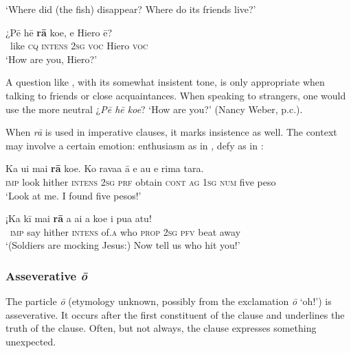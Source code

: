 \glt 
‘Where did (the fish) disappear? Where do its friends live?’ \textstyleExampleref{[R301.179,182]}
\z

\ea\label{ex:4.181}
\gll ¿Pē hē \textbf{rā} koe, e Hiero ē? \\
~like \textsc{cq} \textsc{intens} \textsc{2sg} \textsc{voc} Hiero \textsc{voc} \\

\glt
‘How are you, Hiero?’ \textstyleExampleref{[R315.081]} 
\z

A question like , with its somewhat insistent tone, is only appropriate when talking to friends or close acquaintances. When speaking to strangers, one would use the more neutral ¿\textit{Pē hē koe}? ‘How are you?’ (Nancy Weber, p.c.).

When \textit{rā} is used in imperative clauses, it marks insistence as well. The context may involve a certain emotion: enthusiasm as in , defy as in :

\ea\label{ex:4.182}
\gll Ka u{\ꞌ}i mai \textbf{rā} koe. Ko rava{\ꞌ}a {\ꞌ}ā e au e rima tara. \\
\textsc{imp} look hither \textsc{intens} \textsc{2sg} \textsc{prf} obtain \textsc{cont} \textsc{ag} \textsc{1sg} \textsc{num} five peso \\

\glt 
‘Look at me. I found five pesos!’ \textstyleExampleref{[R334.288–289]}
\z

\ea\label{ex:4.183}
\gll ¡Ka kī mai \textbf{rā} {\ꞌ}a {\ꞌ}ai a koe i pu{\ꞌ}a atu!\\
~\textsc{imp} say hither \textsc{intens} of\textsc{.a} who \textsc{prop} \textsc{2sg} \textsc{pfv} beat away\\

\glt 
‘(Soldiers are mocking Jesus:) Now tell us who hit you!’ \textstyleExampleref{[Mark 14:65]}
\z
{}
\subsubsection[Asseverative {\ꞌ}ō]{Asseverative \textit{{\ꞌ}ō}}\label{sec:4.5.4.5}
The particle \textit{{\ꞌ}ō} (etymology unknown, possibly from the exclamation \textit{{\ꞌ}ō} ‘oh!’) is asseverative. It occurs after the first constituent of the clause and underlines the truth of the clause. Often, but not always, the clause expresses something unexpected.

